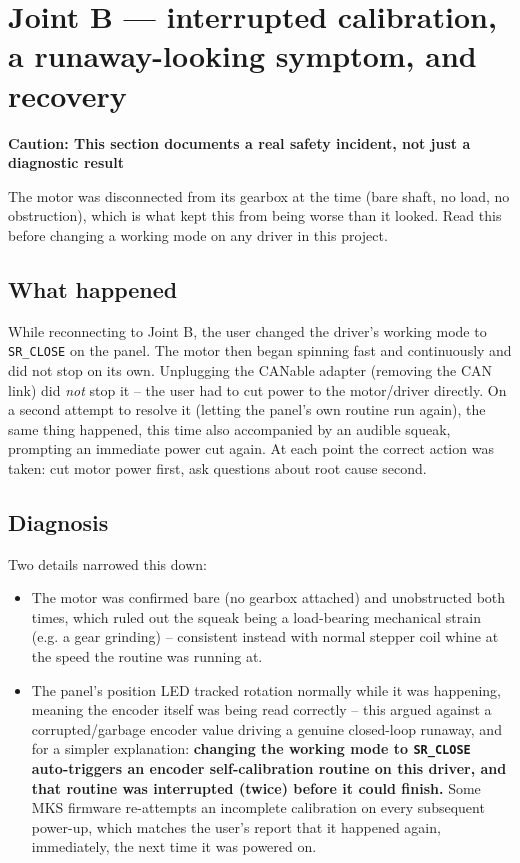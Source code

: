 \documentclass[11pt,letterpaper]{article}
\newenvironment{caution}[1]{%
    \par\addvspace{8pt}%
    \noindent{\color{cautionred}\rule{\linewidth}{0.8pt}}\par\vspace{2pt}
    \noindent\textbf{\color{cautionred}Caution: #1}\par\vspace{2pt}
}{%
    \par\vspace{2pt}\noindent{\color{cautionred}\rule{\linewidth}{0.4pt}}%
    \par\addvspace{8pt}%
}
\begin{document}
\section{Joint B --- interrupted calibration, a runaway-looking symptom, and recovery}
\label{sec:session-joint-b-recalibration}

\begin{caution}{This section documents a real safety incident, not just a diagnostic result}
The motor was disconnected from its gearbox at the time (bare shaft, no load, no obstruction), which is what kept this from being worse than it looked. Read this before changing a working mode on any driver in this project.
\end{caution}

\subsection{What happened}
While reconnecting to Joint B, the user changed the driver's working mode to \texttt{SR\_CLOSE} on the panel. The motor then began spinning fast and continuously and did not stop on its own. Unplugging the CANable adapter (removing the CAN link) did \emph{not} stop it -- the user had to cut power to the motor/driver directly. On a second attempt to resolve it (letting the panel's own routine run again), the same thing happened, this time also accompanied by an audible squeak, prompting an immediate power cut again. At each point the correct action was taken: cut motor power first, ask questions about root cause second.

\subsection{Diagnosis}
Two details narrowed this down:
\begin{itemize}
    \item The motor was confirmed bare (no gearbox attached) and unobstructed both times, which ruled out the squeak being a load-bearing mechanical strain (e.g. a gear grinding) -- consistent instead with normal stepper coil whine at the speed the routine was running at.
    \item The panel's position LED tracked rotation normally while it was happening, meaning the encoder itself was being read correctly -- this argued against a corrupted/garbage encoder value driving a genuine closed-loop runaway, and for a simpler explanation: \textbf{changing the working mode to \texttt{SR\_CLOSE} auto-triggers an encoder self-calibration routine on this driver, and that routine was interrupted (twice) before it could finish.} Some MKS firmware re-attempts an incomplete calibration on every subsequent power-up, which matches the user's report that it happened again, immediately, the next time it was powered on.
\end{itemize}
\end{document}
